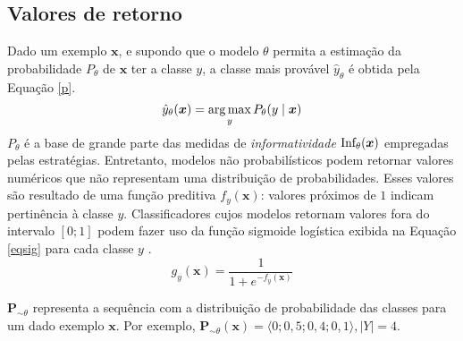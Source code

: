 \subsection{Valores de retorno}\label{defpro}
Dado um exemplo $\bm{x}$, e supondo que o modelo $\theta$ permita a estimação da probabilidade $P_{\theta}$ de $\bm{x}$ ter a classe $y$,
a classe mais provável $\hat{y}_\theta$ é obtida pela Equação \ref{p}.
\begin{equation}\label{p}
  \hat{y}_\theta(\bm{x}) = \operatorname*{arg\,max}_{y} P_{\theta} (y\mid\bm{x})
\end{equation}
$P_{\theta}$ é a base de grande parte das medidas de \textit{informatividade} $\operatorname*{Inf_\theta}(\bm{x})$ empregadas pelas estratégias.
Entretanto, modelos não probabilísticos podem retornar valores numéricos que não representam uma distribuição de probabilidades.
Esses valores são resultado de uma função preditiva $f_y(\bm{x})$:
valores próximos de $1$ indicam pertinência à classe $y$.
Classificadores cujos modelos retornam valores fora do intervalo $[0;1]$ podem fazer uso da função sigmoide logística exibida na Equação \ref{eqsig} para cada classe $y$ \cite{von2006crc}.
\begin{equation}\label{eqsig}
   g_y(\bm{x})=\frac{1}{1+e^{-f_y(\bm{x})}}
\end{equation}

$\bm{P}_{\sim\theta}$ representa a sequência com a distribuição de probabilidade das classes para um dado exemplo $\bm{x}$.
Por exemplo, $\bm{P}_{\sim\theta}(\bm{x})=\langle 0; 0,5; 0,4; 0,1\rangle, |Y|=4$.

